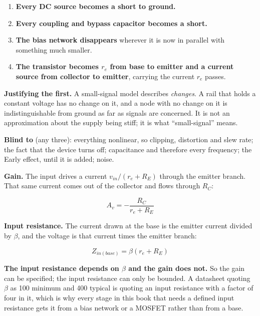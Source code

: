 

\begin{enumerate}
  \item \textbf{Every DC source becomes a short to ground.}
  \item \textbf{Every coupling and bypass capacitor becomes a short.}
  \item \textbf{The bias network disappears} wherever it is now in parallel with something much smaller.
  \item \textbf{The transistor becomes $r_e$ from base to emitter and a current source from collector to emitter}, carrying the current $r_e$ passes.
\end{enumerate}

\textbf{Justifying the first.} A small-signal model describes \emph{changes}. A rail that holds a constant voltage has no change on it, and a node with no change on it is indistinguishable from ground as far as signals are concerned. It is not an approximation about the supply being stiff; it is what ``small-signal'' means.

\textbf{Blind to} (any three): everything nonlinear, so clipping, distortion and slew rate; the fact that the device turns off; capacitance and therefore every frequency; the Early effect, until it is added; noise.


\textbf{Gain.} The input drives a current $v_{in}/(r_e + R_E)$ through the emitter branch. That same current comes out of the collector and flows through $R_C$:

\[
  A_v = -\frac{R_C}{r_e + R_E}
\]

\textbf{Input resistance.} The current drawn at the base is the emitter current divided by $\beta$, and the voltage is that current times the emitter branch:

\[
  Z_{in(base)} = \beta(r_e + R_E)
\]

\textbf{The input resistance depends on $\beta$ and the gain does not.} So the gain can be specified; the input resistance can only be bounded. A datasheet quoting $\beta$ as 100 minimum and 400 typical is quoting an input resistance with a factor of four in it, which is why every stage in this book that needs a defined input resistance gets it from a bias network or a MOSFET rather than from a base.

